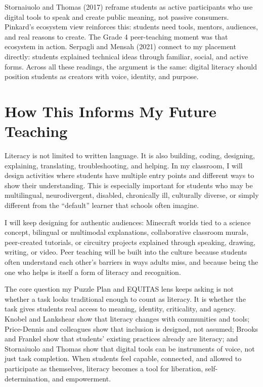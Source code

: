 \documentclass[11pt]{article}
\begin{document}
Stornaiuolo and Thomas (2017) reframe students as active participants who use digital tools to speak and create public meaning, not passive consumers. Pinkard's ecosystem view reinforces this: students need tools, mentors, audiences, and real reasons to create. The Grade 4 peer-teaching moment was that ecosystem in action. Serpagli and Mensah (2021) connect to my placement directly: students explained technical ideas through familiar, social, and active forms. Across all these readings, the argument is the same: digital literacy should position students as creators with voice, identity, and purpose.

\section*{How This Informs My Future Teaching}

Literacy is not limited to written language. It is also building, coding, designing, explaining, translating, troubleshooting, and helping. In my classroom, I will design activities where students have multiple entry points and different ways to show their understanding. This is especially important for students who may be multilingual, neurodivergent, disabled, chronically ill, culturally diverse, or simply different from the ``default'' learner that schools often imagine.

I will keep designing for authentic audiences: Minecraft worlds tied to a science concept, bilingual or multimodal explanations, collaborative classroom murals, peer-created tutorials, or circuitry projects explained through speaking, drawing, writing, or video. Peer teaching will be built into the culture because students often understand each other's barriers in ways adults miss, and because being the one who helps is itself a form of literacy and recognition.

The core question my Puzzle Plan and EQUITAS lens keeps asking is not whether a task looks traditional enough to count as literacy. It is whether the task gives students real access to meaning, identity, criticality, and agency. Knobel and Lankshear show that literacy changes with communities and tools; Price-Dennis and colleagues show that inclusion is designed, not assumed; Brooks and Frankel show that students' existing practices already are literacy; and Stornaiuolo and Thomas show that digital tools can be instruments of voice, not just task completion. When students feel capable, connected, and allowed to participate as themselves, literacy becomes a tool for liberation, self-determination, and empowerment.
\end{document}
